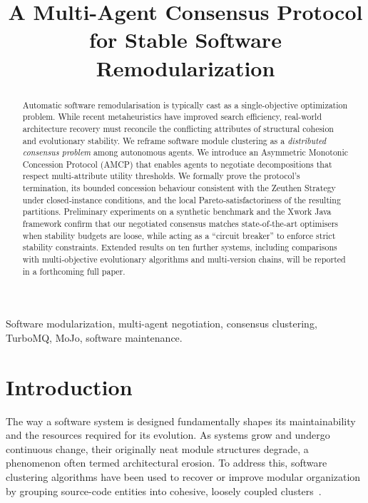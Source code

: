 \documentclass[conference]{IEEEtran}
\title{A Multi-Agent Consensus Protocol for Stable Software Remodularization}
\author{\IEEEauthorblockN{Ahmed F. Ibrahim\\
\IEEEauthorblockA{Western University\\
London, Canada\\
aibrah64@uwo.ca}}
}
\begin{document}
\maketitle

\begin{abstract}
Automatic software remodularisation is typically cast as a single-objective optimization problem. 
While recent metaheuristics have improved search efficiency, real-world architecture recovery must reconcile the conflicting attributes of structural cohesion and evolutionary stability. 
We reframe software module clustering as a \emph{distributed consensus problem} among autonomous agents. 
We introduce an Asymmetric Monotonic Concession Protocol (AMCP) that enables agents to negotiate decompositions that respect multi-attribute utility thresholds. 
We formally prove the protocol's termination, its bounded concession behaviour consistent with the Zeuthen Strategy under closed‑instance conditions, and the local Pareto‑satisfactoriness of the resulting partitions. 
Preliminary experiments on a synthetic benchmark and the Xwork Java framework confirm that our negotiated consensus matches state‑of‑the‑art optimisers when stability budgets are loose, while acting as a ``circuit breaker'' to enforce strict stability constraints.
Extended results on ten further systems, including comparisons with multi‑objective evolutionary algorithms and multi‑version chains, will be reported in a forthcoming full paper.
\end{abstract}

\begin{IEEEkeywords}
Software modularization, multi-agent negotiation, consensus clustering, TurboMQ, MoJo, software maintenance.
\end{IEEEkeywords}

\section{Introduction}
\label{sec:intro}

The way a software system is designed fundamentally shapes its maintainability and the resources required for its evolution. As systems grow and undergo continuous change, their originally neat module structures degrade, a phenomenon often termed architectural erosion. To address this, software clustering algorithms have been used to recover or improve modular organization by grouping source-code entities into cohesive, loosely coupled clusters~\cite{Mancoridis1998,Mitchell2006}.
\end{document}
